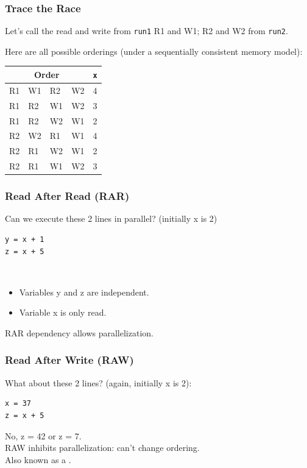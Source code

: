 \begin{frame}
\frametitle{Trace the Race}
Let's call the read and write from {\tt run1} R1 and W1; R2 and W2
from {\tt run2}.

Here are all possible orderings (under a sequentially consistent memory model):
  \begin{center}
    \begin{tabular}{llll|l}
\multicolumn{4}{c|}{Order} & {\tt *x}\\
\hline
R1 & W1 & R2 & W2 & 4 \\
R1 & R2 & W1 & W2 & 3 \\
R1 & R2 & W2 & W1 & 2 \\
R2 & W2 & R1 & W1 & 4 \\
R2 & R1 & W2 & W1 & 2 \\
R2 & R1 & W1 & W2 & 3 \\
    \end{tabular}
  \end{center}

\end{frame}

\begin{frame}[fragile]
\frametitle{Read After Read (RAR)}

Can we execute these 2 lines in parallel? (initially x is 2)
\begin{lstlisting}
y = x + 1
z = x + 5
\end{lstlisting}
\pause
{}\\[1em]
\begin{itemize}
\item Variables y and z are independent.
\item Variable x is only read.
\end{itemize}

RAR dependency allows parallelization.



\end{frame}

\begin{frame}[fragile]
\frametitle{Read After Write (RAW)}


What about these 2 lines? (again, initially x is 2):
\begin{lstlisting}
x = 37
z = x + 5
\end{lstlisting}
\pause
\alert{No, z = 42 or z = 7.}\\[1em]

RAW inhibits parallelization: can't change ordering.\\
Also known as a .

\end{frame}

